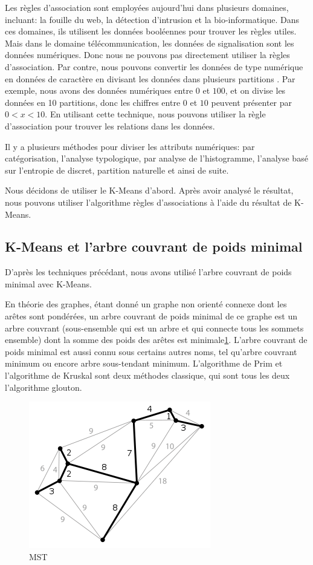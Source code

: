 Les règles d'association sont employées aujourd'hui dans plusieurs domaines, incluant: la fouille du web, la détection d'intrusion et la bio-informatique.  Dans ces domaines, ils utilisent les données booléennes pour trouver les règles utiles. Mais dans le domaine télécommunication, les données de signalisation sont les données numériques. Donc nous ne pouvons pas directement utiliser la règles d'association. Par contre, nous pouvons convertir les données de type numérique en données de caractère en divisant les données dans plusieurs partitions \cite{AR}. Par exemple, nous avons des données numériques entre $0$ et $100$, et on divise les données en 10 partitions, donc les chiffres entre $0$ et $10$ peuvent présenter par $0<x<10$. En utilisant cette technique, nous pouvons utiliser la règle d'association pour trouver les relations dans les données.

 Il y a plusieurs méthodes pour diviser les attributs numériques: par catégorisation, l'analyse typologique, par analyse de l'histogramme, l'analyse basé sur l'entropie de discret, partition naturelle et ainsi de suite. 
 
 Nous décidons de utiliser le K-Means d'abord. Après avoir analysé le résultat, nous pouvons utiliser l'algorithme règles d'associations à l'aide du résultat de K-Means.

\subsection{K-Means et l'arbre couvrant de poids minimal }
D'après les techniques précédant, nous avons utilisé l'arbre couvrant de poids minimal avec K-Means.

En théorie des graphes, étant donné un graphe non orienté connexe dont les arêtes sont pondérées, un arbre couvrant de poids minimal de ce graphe est un arbre couvrant (sous-ensemble qui est un arbre et qui connecte tous les sommets ensemble) dont la somme des poids des arêtes est minimale\ref{fig:mst}. L'arbre couvrant de poids minimal est aussi connu sous certains autres noms, tel qu'arbre couvrant minimum ou encore arbre sous-tendant minimum. L'algorithme de Prim et l'algorithme de Kruskal sont deux méthodes classique, qui sont tous les deux l'algorithme glouton. 

\begin{figure}[H]
\centering
\includegraphics[width=0.5\linewidth]{images/mst}
\caption{MST}
\label{fig:mst}
\end{figure}

